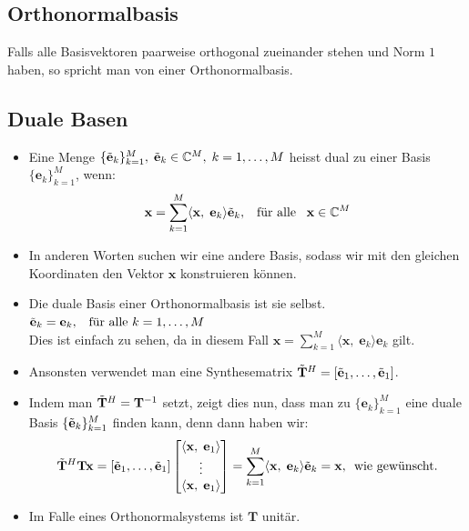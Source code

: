 \documentclass[11pt]{article}
\begin{document}
\pagebreak

\subsection*{Orthonormalbasis}
\vspace*{-0.5cm}
Falls alle Basisvektoren paarweise orthogonal zueinander stehen und Norm $1$ haben, so spricht man von einer Orthonormalbasis.

\vspace*{-0.5cm}
\subsection*{Duale Basen}
\vspace*{-0.5cm}
\begin{itemize}[leftmargin=0pt]
    \item[] Eine Menge $\{\Tilde{\mathbf{e}}_k\}_{k=1}^M, \; \Tilde{\mathbf{e}}_k \in \mathbb{C}^M, \; k = 1,\dots, M$ heisst dual zu einer Basis $\{\mathbf{e}_k\}_{k=1}^M$, wenn:
    $$\mathbf{x} = \sum_{k=1}^M \langle \mathbf{x}, \; \mathbf{e}_k \rangle \Tilde{\mathbf{e}}_k, \hspace{5pt} \text{ für alle } \hspace{5pt} \mathbf{x} \in \mathbb{C}^M$$
    \item[] In anderen Worten suchen wir eine andere Basis, sodass wir mit den gleichen Koordinaten den Vektor $\mathbf{x}$ konstruieren können.
    \item[] Die duale Basis einer Orthonormalbasis ist sie selbst. $\Tilde{\mathbf{e}}_k = \mathbf{e}_k, \hspace{5pt} \text{ für alle } k=1, \dots, M$\\
    Dies ist einfach zu sehen, da in diesem Fall $\mathbf{x} = \sum_{k=1}^M \langle \mathbf{x}, \; \mathbf{e}_k \rangle \mathbf{e}_k$ gilt.
    \item[] Ansonsten verwendet man eine Synthesematrix $\Tilde{\mathbf{T}}^H = \left[\Tilde{\mathbf{e}}_1, \dots,\Tilde{\mathbf{e}}_1 \right]$.
    \item[] Indem man $\Tilde{\mathbf{T}}^H = \mathbf{T}^{-1}$ setzt, zeigt dies nun, dass man zu $\{\mathbf{e}_k\}_{k=1}^M$ eine duale Basis $\{\Tilde{\mathbf{e}}_k\}_{k=1}^M$ finden kann, denn dann haben wir:
    $$\Tilde{\mathbf{T}}^H \mathbf{T} \mathbf{x} = \left[\Tilde{\mathbf{e}}_1, \dots,\Tilde{\mathbf{e}}_1 \right] \begin{bmatrix}
        \langle \mathbf{x}, \; \mathbf{e}_1 \rangle \\
        \vdots \\
        \langle \mathbf{x}, \; \mathbf{e}_1 \rangle
    \end{bmatrix} = \sum_{k=1}^M \langle \mathbf{x}, \; \mathbf{e}_k \rangle \Tilde{\mathbf{e}}_k = \mathbf{x}, \hspace{5pt} \text{wie gewünscht.}$$
    \item[] Im Falle eines Orthonormalsystems ist $\mathbf{T}$ unitär.
\end{itemize}
\end{document}
